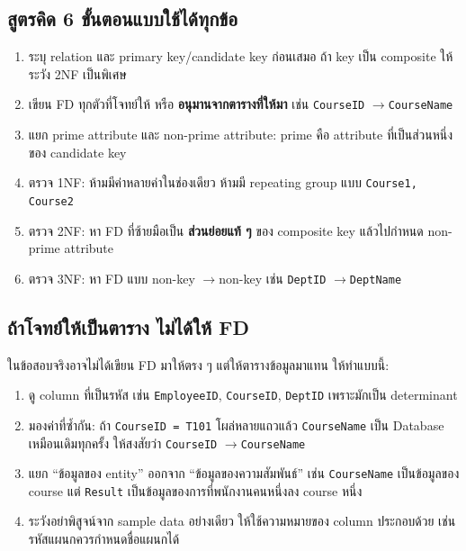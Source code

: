 \documentclass[a4paper,12pt]{article}
\newcommand{\fd}{\(\rightarrow\)}
\newcommand{\schema}[1]{\texttt{#1}}
\begin{document}
\subsection*{สูตรคิด 6 ขั้นตอนแบบใช้ได้ทุกข้อ}
\begin{enumerate}[label=\textbf{Step \arabic*:}, leftmargin=2.4cm]
    \item ระบุ relation และ primary key/candidate key ก่อนเสมอ ถ้า key เป็น composite ให้ระวัง 2NF เป็นพิเศษ
    \item เขียน FD ทุกตัวที่โจทย์ให้ หรือ \textbf{อนุมานจากตารางที่ให้มา} เช่น \schema{CourseID} \fd \schema{CourseName}
    \item แยก prime attribute และ non-prime attribute: prime คือ attribute ที่เป็นส่วนหนึ่งของ candidate key
    \item ตรวจ 1NF: ห้ามมีค่าหลายค่าในช่องเดียว ห้ามมี repeating group แบบ \schema{Course1, Course2}
    \item ตรวจ 2NF: หา FD ที่ซ้ายมือเป็น \textbf{ส่วนย่อยแท้ ๆ} ของ composite key แล้วไปกำหนด non-prime attribute
    \item ตรวจ 3NF: หา FD แบบ non-key \fd non-key เช่น \schema{DeptID} \fd \schema{DeptName}
\end{enumerate}

\subsection*{ถ้าโจทย์ให้เป็นตาราง ไม่ได้ให้ FD}
ในข้อสอบจริงอาจไม่ได้เขียน FD มาให้ตรง ๆ แต่ให้ตารางข้อมูลมาแทน ให้ทำแบบนี้:
\begin{enumerate}[label=\textbf{\arabic*.}]
    \item ดู column ที่เป็นรหัส เช่น \schema{EmployeeID}, \schema{CourseID}, \schema{DeptID} เพราะมักเป็น determinant
    \item มองค่าที่ซ้ำกัน: ถ้า \schema{CourseID = T101} โผล่หลายแถวแล้ว \schema{CourseName} เป็น Database เหมือนเดิมทุกครั้ง ให้สงสัยว่า \schema{CourseID} \fd \schema{CourseName}
    \item แยก ``ข้อมูลของ entity'' ออกจาก ``ข้อมูลของความสัมพันธ์'' เช่น \schema{CourseName} เป็นข้อมูลของ course แต่ \schema{Result} เป็นข้อมูลของการที่พนักงานคนหนึ่งลง course หนึ่ง
    \item ระวังอย่าพิสูจน์จาก sample data อย่างเดียว ให้ใช้ความหมายของ column ประกอบด้วย เช่น รหัสแผนกควรกำหนดชื่อแผนกได้
\end{enumerate}
\end{document}
